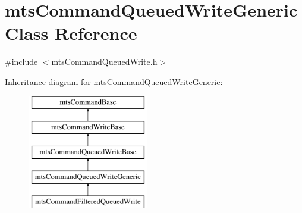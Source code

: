 \hypertarget{classmts_command_queued_write_generic}{\section{mts\-Command\-Queued\-Write\-Generic Class Reference}
\label{classmts_command_queued_write_generic}
}


{\ttfamily \#include $<$mts\-Command\-Queued\-Write.\-h$>$}

Inheritance diagram for mts\-Command\-Queued\-Write\-Generic\-:\begin{figure}[H]
\begin{center}
\leavevmode
\includegraphics[height=5.000000cm]{d1/dd1/classmts_command_queued_write_generic}
\end{center}
\end{figure}
